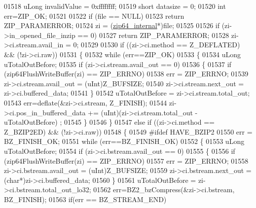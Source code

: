 \begin{DoxyCode}
01518     uLong invalidValue = 0xffffffff;
01519     \textcolor{keywordtype}{short} datasize = 0;
01520     \textcolor{keywordtype}{int} err=ZIP\_OK;
01521 
01522     \textcolor{keywordflow}{if} (file == NULL)
01523         \textcolor{keywordflow}{return} ZIP\_PARAMERROR;
01524     zi = (\hyperlink{structzip64__internal}{zip64\_internal}*)file;
01525 
01526     \textcolor{keywordflow}{if} (zi->in\_opened\_file\_inzip == 0)
01527         \textcolor{keywordflow}{return} ZIP\_PARAMERROR;
01528     zi->ci.stream.avail\_in = 0;
01529 
01530     \textcolor{keywordflow}{if} ((zi->ci.method == Z\_DEFLATED) && (!zi->ci.raw))
01531                 \{
01532                         \textcolor{keywordflow}{while} (err==ZIP\_OK)
01533                         \{
01534                                 uLong uTotalOutBefore;
01535                                 \textcolor{keywordflow}{if} (zi->ci.stream.avail\_out == 0)
01536                                 \{
01537                                         \textcolor{keywordflow}{if} (zip64FlushWriteBuffer(zi) == ZIP\_ERRNO)
01538                                                 err = ZIP\_ERRNO;
01539                                         zi->ci.stream.avail\_out = (uInt)Z\_BUFSIZE;
01540                                         zi->ci.stream.next\_out = zi->ci.buffered\_data;
01541                                 \}
01542                                 uTotalOutBefore = zi->ci.stream.total\_out;
01543                                 err=deflate(&zi->ci.stream,  Z\_FINISH);
01544                                 zi->ci.pos\_in\_buffered\_data += (uInt)(zi->ci.stream.total\_out - 
      uTotalOutBefore) ;
01545                         \}
01546                 \}
01547     \textcolor{keywordflow}{else} \textcolor{keywordflow}{if} ((zi->ci.method == Z\_BZIP2ED) && (!zi->ci.raw))
01548     \{
01549 \textcolor{preprocessor}{#ifdef HAVE\_BZIP2}
01550       err = BZ\_FINISH\_OK;
01551       \textcolor{keywordflow}{while} (err==BZ\_FINISH\_OK)
01552       \{
01553         uLong uTotalOutBefore;
01554         \textcolor{keywordflow}{if} (zi->ci.bstream.avail\_out == 0)
01555         \{
01556           \textcolor{keywordflow}{if} (zip64FlushWriteBuffer(zi) == ZIP\_ERRNO)
01557             err = ZIP\_ERRNO;
01558           zi->ci.bstream.avail\_out = (uInt)Z\_BUFSIZE;
01559           zi->ci.bstream.next\_out = (\textcolor{keywordtype}{char}*)zi->ci.buffered\_data;
01560         \}
01561         uTotalOutBefore = zi->ci.bstream.total\_out\_lo32;
01562         err=BZ2\_bzCompress(&zi->ci.bstream,  BZ\_FINISH);
01563         \textcolor{keywordflow}{if}(err == BZ\_STREAM\_END)

\end{DoxyCode}
